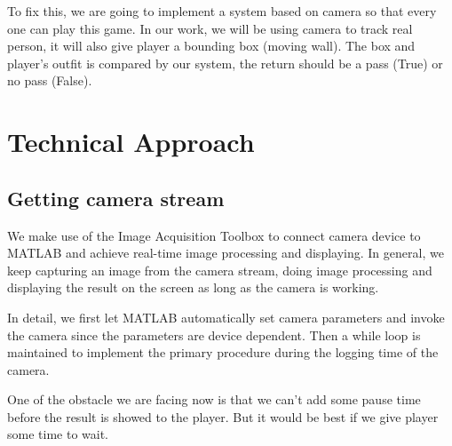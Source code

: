 \documentclass[conference,compsoc]{IEEEtran}
\begin{document}
	\par
		To fix this, we are going to implement a system based on camera so that every one can play this game.
		In our work, we will be using camera to track real person, it will also give player a bounding box (moving wall).
		The box and player's outfit is compared by our system, the return should be a pass (True) or no pass (False).
\section{Technical Approach}
\subsection{Getting camera stream}
\par
We make use of the Image Acquisition Toolbox to connect camera device to MATLAB and achieve real-time image processing and displaying. In general, we keep capturing an image from the camera stream, doing image processing and displaying the result on the screen as long as the camera is working.
\par
In detail, we first let MATLAB automatically set camera parameters and invoke the camera since the parameters are device dependent. Then a while loop is maintained to implement the primary procedure during the logging time of the camera.
\par
One of the obstacle we are facing now is that we can't add some pause time before the result is showed to the player. But it would be best if we give player some time to wait.
\end{document}
